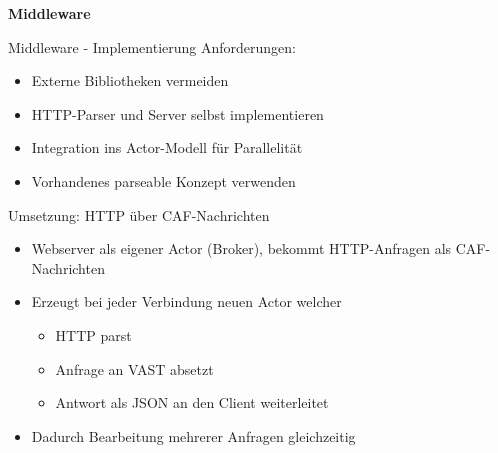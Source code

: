 \documentclass[9pt]{beamer}
\begin{document}
	\begin{frame}{}
		\begin{center}
			\LARGE \textbf{Middleware}
		\end{center}
	\end{frame}

\begin{frame}{Middleware - Implementierung}{}
	Anforderungen:
	\begin{itemize}
		\item Externe Bibliotheken vermeiden
		\item HTTP-Parser und Server selbst implementieren
		\item Integration ins Actor-Modell für Parallelität
		\item Vorhandenes parseable Konzept verwenden
	\end{itemize}
	Umsetzung: HTTP über CAF-Nachrichten
	\begin{itemize}
        \item Webserver als eigener Actor (Broker), bekommt HTTP-Anfragen als CAF-Nachrichten
		\item Erzeugt bei jeder Verbindung neuen Actor welcher
            \begin{itemize}
                \item HTTP parst
                \item Anfrage an VAST absetzt
                \item Antwort als JSON an den Client weiterleitet
            \end{itemize}
		\item Dadurch Bearbeitung mehrerer Anfragen gleichzeitig
	\end{itemize}
\end{frame}
\end{document}
